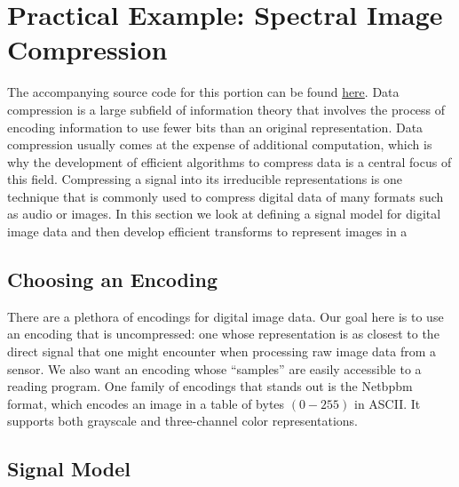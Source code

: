 \documentclass[12pt,technote]{IEEEtran}
\begin{document}
\section{Practical Example: Spectral Image Compression}
The accompanying source code for this portion can be found \href{https://github.com/henry-2025/math189-spectral-compression}{here}.
Data compression is a large subfield of information theory that involves the process of encoding information to use fewer bits than an original representation. Data compression usually comes at the expense of additional computation, which is why the development of efficient algorithms to compress data is a central focus of this field. Compressing a signal into its irreducible representations is one technique that is commonly used to compress digital data of many formats such as audio or images. In this section we look at defining a signal model for digital image data and then develop efficient transforms to represent images in a 

\subsection{Choosing an Encoding}
There are a plethora of encodings for digital image data. Our goal here is to use an encoding that is uncompressed: one whose representation is as closest to the direct signal that one might encounter when processing raw image data from a sensor. We also want an encoding whose ``samples'' are easily accessible to a reading program. %
One family of encodings that stands out is the Netbpbm format, which encodes an image in a table of bytes $(0-255)$ in ASCII. It supports both grayscale and three-channel color representations.

\subsection{Signal Model}
\end{document}
